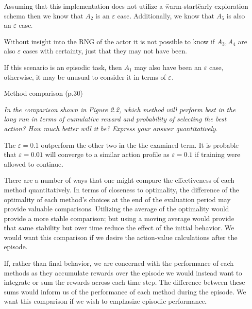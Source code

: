 \documentclass[12pt,letterpaper]{exam}
\begin{document}
\begin{questions}
	\begin{solution}
		Assuming that this implementation does not utilize a \"warm-start\" early exploration
		schema then we know that \(A_2\) is an \(\varepsilon\) case.
		Additionally, we know that \(A_5\) is also an \(\varepsilon\) case.

		Without insight into the RNG of the actor it is not possible to know if \(A_3,A_4\)
		are also \(\varepsilon\) cases with certainty, just that they may not have been.

		If this scenario is an episodic task, then \(A_1\) may also have been an \(\varepsilon\) case,
		otherwise, it may be unusual to consider it in terms of \(\varepsilon\).
	\end{solution}
	
	\question%
	Method comparison (p.30)
	
	\emph{In the comparison shown in Figure 2.2, which method will perform best in the long run in terms of 
	cumulative reward and probability of selecting the best action? How much better will it be? 
	Express your answer quantitatively.}

	\begin{solution}
		The \(\varepsilon=0.1\) outperform the other two in the the examined term.
		It is probable that \(\varepsilon=0.01\) will converge to a similar action profile
		as \(\varepsilon=0.1\) if training were allowed to continue.

		There are a number of ways that one might compare the effectiveness of each method quantitatively.
		In terms of closeness to optimality, the difference of the optimality of each method's choices
		at the end of the evaluation period may provide valuable comparisons.
		Utilizing the average of the optimality would provide a more stable comparison;
		but using a moving average would provide that same stability but over time reduce the effect 
		of the initial behavior.
		We would want this comparison if we desire the action-value calculations after the episode.

		If, rather than final behavior, we are concerned with the performance of each methods as they
		accumulate rewards over the episode we would instead want to integrate or sum the rewards across each time step. 
		The difference between these sums would inform us of the performance of each method during the episode.
		We want this comparison if we wish to emphasize episodic performance.
	\end{solution}


\end{questions}
\end{document}
